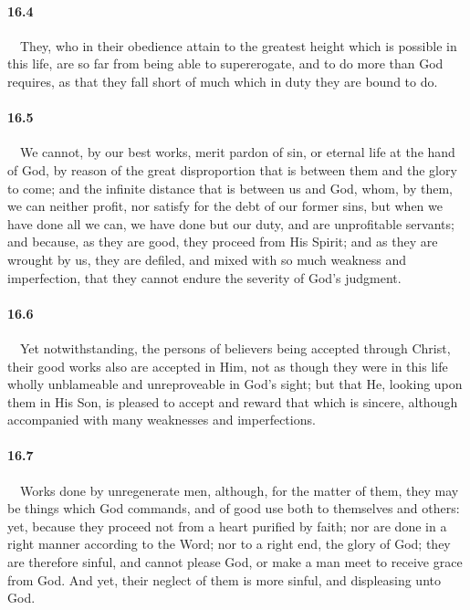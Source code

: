 \paragraph{16.4}\ \ They, who in their obedience attain to the greatest height which is possible in this life, are so far from being able to supererogate, and to do more than God requires, as that they fall short of much which in duty they are bound to do.   
\bigskip
\paragraph{16.5}\ \ We cannot, by our best works, merit pardon of sin, or eternal life at the hand of God, by reason of the great disproportion that is between them and the glory to come; and the infinite distance that is between us and God, whom, by them, we can neither profit, nor satisfy for the debt of our former sins, but when we have done all we can, we have done but our duty, and are unprofitable servants; and because, as they are good, they proceed from His Spirit; and as they are wrought by us, they are defiled, and mixed with so much weakness and imperfection, that they cannot endure the severity of God's judgment.    
\bigskip
\paragraph{16.6}\ \ Yet notwithstanding, the persons of believers being accepted through Christ, their good works also are accepted in Him, not as though they were in this life wholly unblameable and unreproveable in God's sight; but that He, looking upon them in His Son, is pleased to accept and reward that which is sincere, although accompanied with many weaknesses and imperfections.   
\bigskip
\paragraph{16.7}\ \ Works done by unregenerate men, although, for the matter of them, they may be things which God commands, and of good use both to themselves and others: yet, because they proceed not from a heart purified by faith; nor are done in a right manner according to the Word; nor to a right end, the glory of God; they are therefore sinful, and cannot please God, or make a man meet to receive grace from God. And yet, their neglect of them is more sinful, and displeasing unto God.  

